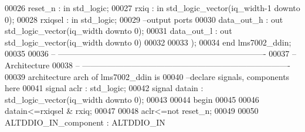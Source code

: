 \begin{DoxyCode}
00026       \textcolor{vhdlchar}{reset_n}       \textcolor{vhdlchar}{:} \textcolor{keywordflow}{in} \textcolor{comment}{std\_logic};
00027         \textcolor{vhdlchar}{rxiq}            \textcolor{vhdlchar}{:} \textcolor{keywordflow}{in} \textcolor{comment}{std\_logic\_vector}\textcolor{vhdlchar}{(}\textcolor{vhdlchar}{iq_width}\textcolor{vhdlchar}{-}\textcolor{vhdllogic}{}\textcolor{vhdllogic}{1} \textcolor{keywordflow}{downto} \textcolor{vhdllogic}{}\textcolor{vhdllogic}{0}\textcolor{vhdlchar}{)};
00028         \textcolor{vhdlchar}{rxiqsel}     \textcolor{vhdlchar}{:} \textcolor{keywordflow}{in} \textcolor{comment}{std\_logic};
00029 \textcolor{keyword}{        --output ports }
00030         \textcolor{vhdlchar}{data_out_h}  \textcolor{vhdlchar}{:} \textcolor{keywordflow}{out} \textcolor{comment}{std\_logic\_vector}\textcolor{vhdlchar}{(}\textcolor{vhdlchar}{iq_width} \textcolor{keywordflow}{downto} \textcolor{vhdllogic}{}\textcolor{vhdllogic}{0}\textcolor{vhdlchar}{)};
00031         \textcolor{vhdlchar}{data_out_l}  \textcolor{vhdlchar}{:} \textcolor{keywordflow}{out} \textcolor{comment}{std\_logic\_vector}\textcolor{vhdlchar}{(}\textcolor{vhdlchar}{iq_width} \textcolor{keywordflow}{downto} \textcolor{vhdllogic}{}\textcolor{vhdllogic}{0}\textcolor{vhdlchar}{)}
00032         
00033         \textcolor{vhdlchar}{)};
00034 \textcolor{keywordflow}{end} \textcolor{vhdlchar}{lms7002\_ddin};
00035 
00036 \textcolor{keyword}{-- ----------------------------------------------------------------------------}
00037 \textcolor{keyword}{-- Architecture}
00038 \textcolor{keyword}{-- ----------------------------------------------------------------------------}
00039 \textcolor{keywordflow}{architecture} arch \textcolor{keywordflow}{of} lms7002_ddin is
00040 \textcolor{keyword}{--declare signals,  components here}
00041 \textcolor{keywordflow}{signal} \textcolor{vhdlchar}{aclr}     \textcolor{vhdlchar}{:} \textcolor{comment}{std\_logic};
00042 \textcolor{keywordflow}{signal} \textcolor{vhdlchar}{datain}   \textcolor{vhdlchar}{:} \textcolor{comment}{std\_logic\_vector}\textcolor{vhdlchar}{(}\textcolor{vhdlchar}{iq_width} \textcolor{keywordflow}{downto} \textcolor{vhdllogic}{}\textcolor{vhdllogic}{0}\textcolor{vhdlchar}{)};
00043 
00044 \textcolor{vhdlkeyword}{begin}
00045 
00046 \textcolor{vhdlchar}{datain}\textcolor{vhdlchar}{<=}\textcolor{vhdlchar}{rxiqsel} \textcolor{vhdlchar}{&} \textcolor{vhdlchar}{rxiq};
00047 
00048 \textcolor{vhdlchar}{aclr}\textcolor{vhdlchar}{<=}\textcolor{keywordflow}{not} \textcolor{vhdlchar}{reset_n};
00049 
00050     ALTDDIO\_IN\_component : ALTDDIO\_IN

\end{DoxyCode}
